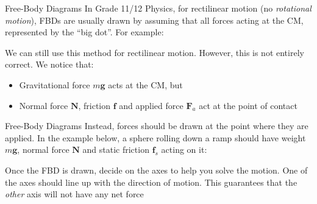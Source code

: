 \documentclass[12pt,compress,aspectratio=169]{beamer}
\begin{document}
\begin{frame}{Free-Body Diagrams}
  In Grade 11/12 Physics, for rectilinear motion (no \emph{rotational motion}),
  FBDs are usually drawn by assuming that all forces acting at the CM,
  represented by the ``big dot''. For example:
  \begin{center}
    \vspace{-.15in}
  \end{center}
  \vspace{-.1in}We can still use this method for rectilinear motion. However,
  this is not entirely correct. We notice that:
  \begin{itemize}
  \item Gravitational force $m\bm{g}$ acts at the CM, but
  \item Normal force $\bm{N}$, friction $\bm{f}$ and applied force $\bm{F}_a$
    act at the point of contact
  \end{itemize}
\end{frame}



\begin{frame}{Free-Body Diagrams}
  Instead, forces should be drawn at the point where they are applied. In the
  example below, a sphere rolling down a ramp should have weight $m\bm{g}$,
  normal force $\bm{N}$ and static friction $\bm{f}_s$ acting on it:
  \begin{center}
  \end{center}
  Once the FBD is drawn, decide on the axes to help you solve the motion. One of
  the axes should line up with the direction of motion. This guarantees that the 
  \emph{other} axis will not have any net force
\end{frame}
\end{document}
